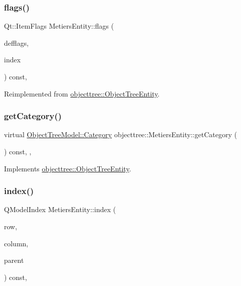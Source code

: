 \subsubsection{\texorpdfstring{flags()}{flags()}}
{\footnotesize\ttfamily Qt\+::\+Item\+Flags Metiers\+Entity\+::flags (\begin{DoxyParamCaption}\item[{Qt\+::\+Item\+Flags}]{defflags,  }\item[{const Q\+Model\+Index \&}]{index }\end{DoxyParamCaption}) const\hspace{0.3cm}{\ttfamily [override]}, {\ttfamily [virtual]}}



Reimplemented from \mbox{\hyperlink{classobjecttree_1_1_object_tree_entity_a71042bfb5a8328bcbde9d283c0b1b28c}{objecttree\+::\+Object\+Tree\+Entity}}.

\mbox{\label{classobjecttree_1_1_metiers_entity_ad05591af32392d00d9b8695bbb32b229}} 
\subsubsection{\texorpdfstring{getCategory()}{getCategory()}}
{\footnotesize\ttfamily virtual \mbox{\hyperlink{class_object_tree_model_a379e9d6b0d381853785adf62095ba4e3}{Object\+Tree\+Model\+::\+Category}} objecttree\+::\+Metiers\+Entity\+::get\+Category (\begin{DoxyParamCaption}{ }\end{DoxyParamCaption}) const\hspace{0.3cm}{\ttfamily [inline]}, {\ttfamily [override]}, {\ttfamily [virtual]}}



Implements \mbox{\hyperlink{classobjecttree_1_1_object_tree_entity_aa4e80e7fa80672c1b9902add665abc77}{objecttree\+::\+Object\+Tree\+Entity}}.

\mbox{\label{classobjecttree_1_1_metiers_entity_af72f3b12bc78b56985b6818dab24626b}} 
\subsubsection{\texorpdfstring{index()}{index()}}
{\footnotesize\ttfamily Q\+Model\+Index Metiers\+Entity\+::index (\begin{DoxyParamCaption}\item[{int}]{row,  }\item[{int}]{column,  }\item[{const Q\+Model\+Index \&}]{parent }\end{DoxyParamCaption}) const\hspace{0.3cm}{\ttfamily [override]}, {\ttfamily [virtual]}}



